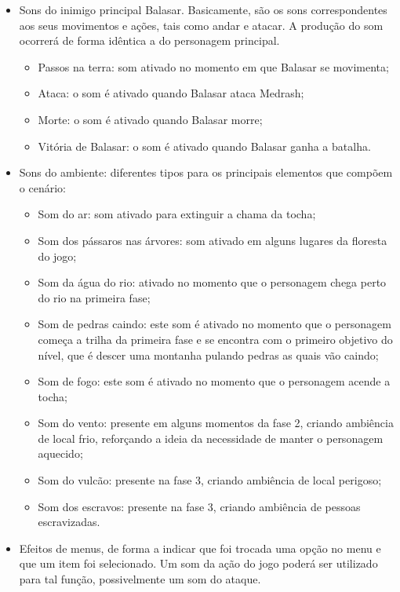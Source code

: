 \begin{itemize}
\item Sons do inimigo principal Balasar. Basicamente, são os sons correspondentes
 aos seus movimentos e ações, tais como andar e atacar. A
 produção do som ocorrerá de forma idêntica a do personagem principal.

\begin{itemize}
\item Passos na terra: som ativado no momento em que Balasar se
 movimenta;
\item Ataca: o som é ativado quando Balasar ataca Medrash;
\item Morte: o som é ativado quando Balasar morre;
\item Vitória de Balasar: o som é ativado quando Balasar ganha a batalha.
\end{itemize}

\item Sons do ambiente: diferentes tipos para os principais elementos que
 compõem o cenário:

\begin{itemize}
\item Som do ar: som ativado para extinguir a chama da tocha;
\item Som dos pássaros nas árvores: som ativado em alguns lugares 
da floresta do jogo;
\item Som da água do rio: ativado no momento que o personagem chega 
perto do rio na primeira fase;
\item Som de pedras caindo: este som é ativado no momento que o personagem 
começa a trilha da primeira fase e se encontra com o primeiro objetivo do 
nível, que é descer uma montanha pulando pedras as quais vão caindo;
\item Som de fogo: este som é ativado no momento que o personagem 
acende a tocha;
\item Som do vento: presente em alguns momentos da fase 2, criando 
ambiência de local frio, reforçando a ideia da necessidade de manter
 o personagem aquecido;
\item Som do vulcão: presente na fase 3, criando ambiência de local perigoso;
\item Som dos escravos: presente na fase 3, criando ambiência de pessoas escravizadas.

\end{itemize}

\item Efeitos de menus, de forma a indicar que foi trocada uma opção no 
menu e que um item foi selecionado. Um som da ação do jogo poderá ser
 utilizado para tal função, possivelmente um som do ataque.
 
\end{itemize}

